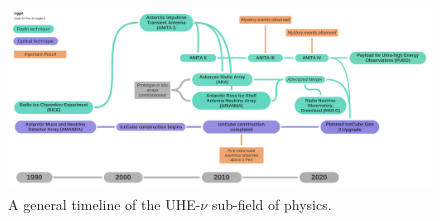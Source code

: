 \documentclass[../../../main.tex]{subfiles}
\begin{document}
\begin{figure}
\centering
\includegraphics[width=\textwidth]{figures/timeline.pdf}
\caption{\label{fig:flow} A general timeline of the UHE-$\nu$ sub-field of physics.}
\end{figure}
\end{document}
